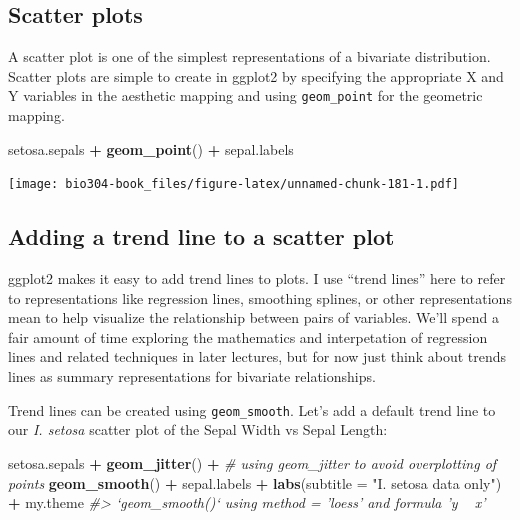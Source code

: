 \documentclass[]{book}
\newenvironment{Shaded}{\begin{snugshade}}{\end{snugshade}}
\newcommand{\CommentTok}[1]{\textcolor[rgb]{0.56,0.35,0.01}{\textit{#1}}}
\newcommand{\DataTypeTok}[1]{\textcolor[rgb]{0.13,0.29,0.53}{#1}}
\newcommand{\KeywordTok}[1]{\textcolor[rgb]{0.13,0.29,0.53}{\textbf{#1}}}
\newcommand{\NormalTok}[1]{#1}
\newcommand{\OperatorTok}[1]{\textcolor[rgb]{0.81,0.36,0.00}{\textbf{#1}}}
\newcommand{\StringTok}[1]{\textcolor[rgb]{0.31,0.60,0.02}{#1}}
\theoremstyle{definition}
\theoremstyle{definition}
\theoremstyle{definition}
\theoremstyle{remark}
\begin{document}
\hypertarget{scatter-plots-1}{%
\subsection{Scatter plots}\label{scatter-plots-1}}

A scatter plot is one of the simplest representations of a bivariate
distribution. Scatter plots are simple to create in ggplot2 by
specifying the appropriate X and Y variables in the aesthetic mapping
and using \texttt{geom\_point} for the geometric mapping.

\begin{Shaded}
\begin{Highlighting}[]
\NormalTok{setosa.sepals  }\OperatorTok{+}\StringTok{ }\KeywordTok{geom_point}\NormalTok{() }\OperatorTok{+}\StringTok{ }\NormalTok{sepal.labels}
\end{Highlighting}
\end{Shaded}

\texttt{[image: bio304-book\_files/figure-latex/unnamed-chunk-181-1.pdf]}

\hypertarget{adding-a-trend-line-to-a-scatter-plot}{%
\subsection{Adding a trend line to a scatter
plot}\label{adding-a-trend-line-to-a-scatter-plot}}

ggplot2 makes it easy to add trend lines to plots. I use ``trend lines''
here to refer to representations like regression lines, smoothing
splines, or other representations mean to help visualize the
relationship between pairs of variables. We'll spend a fair amount of
time exploring the mathematics and interpetation of regression lines and
related techniques in later lectures, but for now just think about
trends lines as summary representations for bivariate relationships.

Trend lines can be created using \texttt{geom\_smooth}. Let's add a
default trend line to our \emph{I. setosa} scatter plot of the Sepal
Width vs Sepal Length:

\begin{Shaded}
\begin{Highlighting}[]
\NormalTok{setosa.sepals }\OperatorTok{+}\StringTok{ }
\StringTok{  }\KeywordTok{geom_jitter}\NormalTok{() }\OperatorTok{+}\StringTok{  }\CommentTok{# using geom_jitter to avoid overplotting of points}
\StringTok{  }\KeywordTok{geom_smooth}\NormalTok{() }\OperatorTok{+}
\StringTok{  }\NormalTok{sepal.labels }\OperatorTok{+}\StringTok{ }\KeywordTok{labs}\NormalTok{(}\DataTypeTok{subtitle =} \StringTok{"I. setosa data only"}\NormalTok{) }\OperatorTok{+}
\StringTok{  }\NormalTok{my.theme}
\CommentTok{#> `geom_smooth()` using method = 'loess' and formula 'y ~ x'}
\end{Highlighting}
\end{Shaded}
\end{document}
